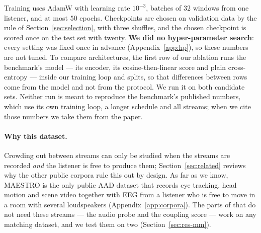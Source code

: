 Training uses AdamW \citep{loshchilov2019adamw} with learning rate $10^{-3}$,
batches of $32$ windows from one listener, and at most $50$ epochs. Checkpoints
are chosen on validation data by the rule of Section~\ref{sec:selection}, with
three shuffles, and the chosen checkpoint is scored once on the test set with
twenty. \textbf{We did no hyper-parameter search}: every setting was fixed once
in advance (Appendix~\ref{app:hp}), so these numbers are not tuned. To compare
architectures, the first row of our ablation runs the benchmark's model
\citep{maestro2026} --- its encoder, its cosine-then-linear score and plain
cross-entropy --- inside our training loop and splits, so that differences
between rows come from the model and not from the protocol. We run it on both
candidate sets. Neither run is meant to reproduce the benchmark's published
numbers, which use its own training loop, a longer schedule and all streams;
when we cite those numbers we take them from the paper.

\paragraph{Why this dataset.}
Crowding out between streams can only be studied when the streams are recorded
\emph{and} the listener is free to produce them; Section~\ref{sec:related}
reviews why the other public corpora rule this out by design. As far as we know,
MAESTRO is the only public AAD dataset that records eye tracking, head motion
and scene video together with EEG from a listener who is free to move in a room
with several loudspeakers (Appendix~\ref{app:corpora}). The parts of \merit{}
that do not need these streams --- the audio probe and the coupling score ---
work on any matching dataset, and we test them on two
(Section~\ref{sec:res-mm}).
